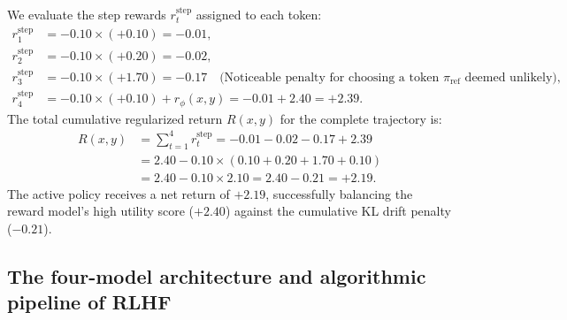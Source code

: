 \documentclass[../../../main.tex]{subfiles}
\begin{document}
\begin{tcolorbox}[colback=cardBg,colframe=cardLine,arc=2pt,boxrule=0.5pt,title=\textbf{Pedagogical Walkthrough: PPO Regularized Reward Calculation with Concrete Numbers}]
We evaluate the step rewards $r_t^{\text{step}}$ assigned to each token:
\begin{align*}
r_1^{\text{step}} &= -0.10 \times (+0.10) = -0.01, \\
r_2^{\text{step}} &= -0.10 \times (+0.20) = -0.02, \\
r_3^{\text{step}} &= -0.10 \times (+1.70) = -0.17 \quad \text{(Noticeable penalty for choosing a token $\pi_{\text{ref}}$ deemed unlikely)}, \\
r_4^{\text{step}} &= -0.10 \times (+0.10) + r_\phi(x, y) = -0.01 + 2.40 = +2.39.
\end{align*}
The total cumulative regularized return $R(x, y)$ for the complete trajectory is:
\begin{align*}
R(x, y) &= \sum_{t=1}^4 r_t^{\text{step}} = -0.01 - 0.02 - 0.17 + 2.39 \\
&= 2.40 - 0.10 \times \left( 0.10 + 0.20 + 1.70 + 0.10 \right) \\
&= 2.40 - 0.10 \times 2.10 = 2.40 - 0.21 = \mathbf{+2.19}.
\end{align*}
The active policy receives a net return of $+2.19$, successfully balancing the reward model's high utility score ($+2.40$) against the cumulative KL drift penalty ($-0.21$).
\end{tcolorbox}

\subsection{The four-model architecture and algorithmic pipeline of RLHF}
\label{subsec:four_model_architecture_algorithm}
\end{document}
